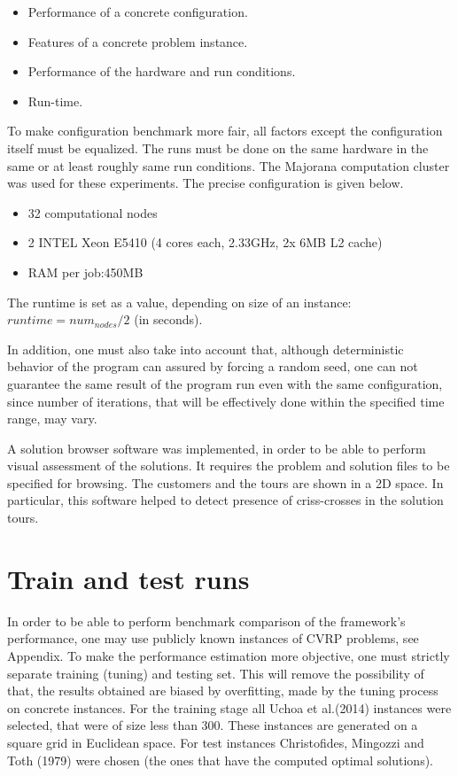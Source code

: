 \documentclass[12pt,a4paper,oneside]{book}
\begin{document}
\begin{itemize}
\item Performance of a concrete configuration.
\item Features of a concrete problem instance.
\item Performance of the hardware and run conditions.
\item Run-time.
\end{itemize}

To make configuration benchmark more fair, all factors except the configuration itself must be equalized. The runs must be done on the same hardware in the same or at least roughly same run conditions. The Majorana computation cluster was used for these experiments. The precise configuration is given below.
\begin{itemize}
\item 32 computational nodes
\item 2 INTEL Xeon E5410 (4 cores each, 2.33GHz, 2x 6MB L2 cache)
\item RAM per job:450MB
\end{itemize}

The runtime is set as a value, depending on size of an instance: $runtime = num_{nodes} / 2$ (in seconds).

In addition, one must also take into account that, although deterministic behavior of the program can assured by forcing a random seed, one can not guarantee the same result of the program run even with the same configuration, since number of iterations, that will be effectively done within the specified time range, may vary.

A solution browser software was implemented, in order to be able to perform visual assessment of the solutions. It requires the problem and solution files to be specified for browsing. The customers and the tours are shown in a 2D space. In particular, this software helped to detect presence of criss-crosses in the solution tours.

\section{Train and test runs}

In order to be able to perform benchmark comparison of the framework's performance, one may use publicly known instances of CVRP problems, see Appendix. To make the performance estimation more objective, one must strictly separate training (tuning) and testing set. This will remove the possibility of that, the results obtained are biased by overfitting, made by the tuning process on concrete instances. For the training stage all Uchoa et al.(2014) instances were selected, that were of size less than 300. These instances are generated on a square grid in Euclidean space. For test instances Christofides, Mingozzi and Toth (1979) were chosen (the ones that have the computed optimal solutions).
\end{document}
